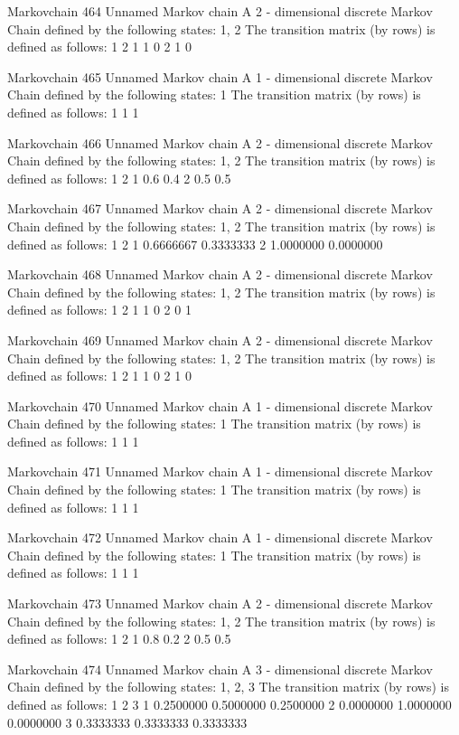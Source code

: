 \documentclass[
  nojss]{jss}
\begin{document}
\begin{CodeChunk}
\begin{CodeOutput}
Markovchain  464 
Unnamed Markov chain 
 A  2 - dimensional discrete Markov Chain defined by the following states: 
 1, 2 
 The transition matrix  (by rows)  is defined as follows: 
  1 2
1 1 0
2 1 0

Markovchain  465 
Unnamed Markov chain 
 A  1 - dimensional discrete Markov Chain defined by the following states: 
 1 
 The transition matrix  (by rows)  is defined as follows: 
  1
1 1

Markovchain  466 
Unnamed Markov chain 
 A  2 - dimensional discrete Markov Chain defined by the following states: 
 1, 2 
 The transition matrix  (by rows)  is defined as follows: 
    1   2
1 0.6 0.4
2 0.5 0.5

Markovchain  467 
Unnamed Markov chain 
 A  2 - dimensional discrete Markov Chain defined by the following states: 
 1, 2 
 The transition matrix  (by rows)  is defined as follows: 
          1         2
1 0.6666667 0.3333333
2 1.0000000 0.0000000

Markovchain  468 
Unnamed Markov chain 
 A  2 - dimensional discrete Markov Chain defined by the following states: 
 1, 2 
 The transition matrix  (by rows)  is defined as follows: 
  1 2
1 1 0
2 0 1

Markovchain  469 
Unnamed Markov chain 
 A  2 - dimensional discrete Markov Chain defined by the following states: 
 1, 2 
 The transition matrix  (by rows)  is defined as follows: 
  1 2
1 1 0
2 1 0

Markovchain  470 
Unnamed Markov chain 
 A  1 - dimensional discrete Markov Chain defined by the following states: 
 1 
 The transition matrix  (by rows)  is defined as follows: 
  1
1 1

Markovchain  471 
Unnamed Markov chain 
 A  1 - dimensional discrete Markov Chain defined by the following states: 
 1 
 The transition matrix  (by rows)  is defined as follows: 
  1
1 1

Markovchain  472 
Unnamed Markov chain 
 A  1 - dimensional discrete Markov Chain defined by the following states: 
 1 
 The transition matrix  (by rows)  is defined as follows: 
  1
1 1

Markovchain  473 
Unnamed Markov chain 
 A  2 - dimensional discrete Markov Chain defined by the following states: 
 1, 2 
 The transition matrix  (by rows)  is defined as follows: 
    1   2
1 0.8 0.2
2 0.5 0.5

Markovchain  474 
Unnamed Markov chain 
 A  3 - dimensional discrete Markov Chain defined by the following states: 
 1, 2, 3 
 The transition matrix  (by rows)  is defined as follows: 
          1         2         3
1 0.2500000 0.5000000 0.2500000
2 0.0000000 1.0000000 0.0000000
3 0.3333333 0.3333333 0.3333333


\end{CodeOutput}
\end{CodeChunk}
\end{document}
